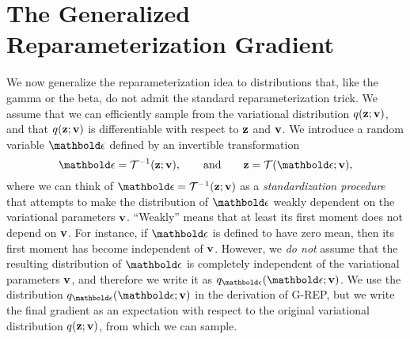 \vspace*{-5pt}
\section{The Generalized Reparameterization Gradient}
\vspace*{-5pt}
\label{sec:g-rep}

We now generalize the reparameterization idea to distributions that, like the gamma or the beta, do not admit the standard reparameterization trick. We assume that we can efficiently sample from the variational distribution $q(\mathbf{z};\mathbf{v})$, and that $q(\mathbf{z};\mathbf{v})$ is differentiable with respect to $\mathbf{z}$ and $\mathbf{v}$.
%
We introduce a random variable $\beps$ defined by an invertible transformation 
\begin{equation}
\beps = \Tcal^{-1}(\bz;\bv), \qquad \textrm{and} \qquad \bz=\Tcal(\beps;\bv),
\end{equation} 
where we can think of $\beps = \Tcal^{-1}(\bz;\bv)$ as a \emph{standardization procedure} that 
attempts to make the distribution of $\beps$ weakly dependent on the variational parameters $\mathbf{v}$. ``Weakly'' means that at least its first moment does not depend on $\mathbf{v}$. For instance, if $\beps$ is defined to have zero mean, then its first moment has become independent of $\mathbf{v}$. However, we \emph{do not} assume that the resulting distribution of $\beps$ is completely independent of the variational parameters $\mathbf{v}$, and therefore we write it as $q_{\beps}(\beps;\bv)$. We use the distribution $q_{\beps}(\beps;\bv)$ in the derivation of \gls{G-REP}, but we write the final gradient as an expectation with respect to the original variational distribution $q(\mathbf{z};\mathbf{v})$, from which we can sample. 


